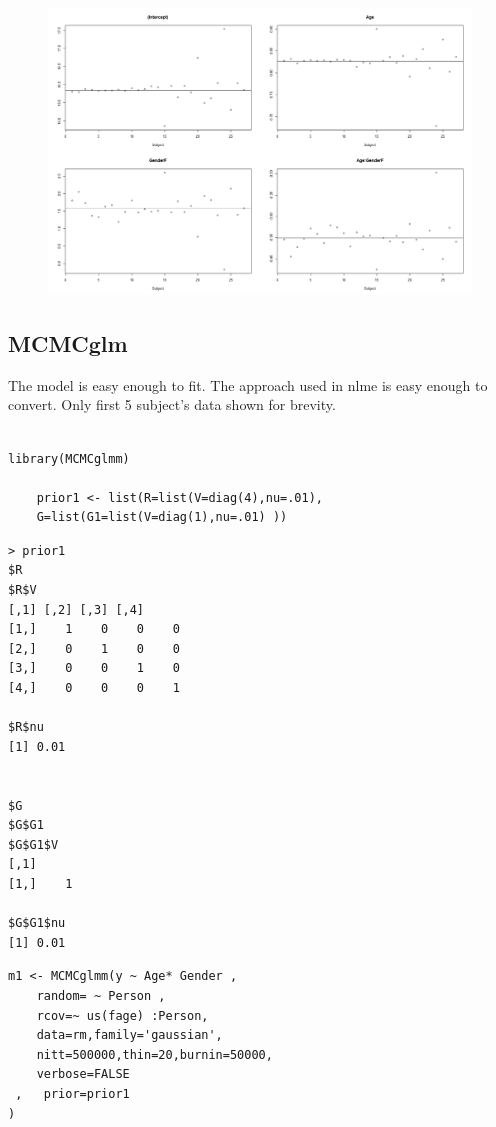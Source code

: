 \documentclass[a4paper,12pt]{article}
\begin{document}
\begin{figure}
\centering
\includegraphics[width=0.7\linewidth]{images/RbloggersPlot4}
\caption{}
\label{fig:RbloggersPlot4}
\end{figure}


\subsection{MCMCglm}

The model is easy enough to fit. The approach used in nlme is easy enough to convert. Only first 5 subject's data shown for brevity. 

\begin{framed}
	\begin{verbatim}
	
library(MCMCglmm)	
	
	prior1 <- list(R=list(V=diag(4),nu=.01),
    G=list(G1=list(V=diag(1),nu=.01) ))

\end{verbatim}
\end{framed}

\begin{verbatim}
> prior1
$R
$R$V
[,1] [,2] [,3] [,4]
[1,]    1    0    0    0
[2,]    0    1    0    0
[3,]    0    0    1    0
[4,]    0    0    0    1

$R$nu
[1] 0.01


$G
$G$G1
$G$G1$V
[,1]
[1,]    1

$G$G1$nu
[1] 0.01

\end{verbatim}

\begin{framed}
	\begin{verbatim}
m1 <- MCMCglmm(y ~ Age* Gender , 
    random= ~ Person ,
    rcov=~ us(fage) :Person,
    data=rm,family='gaussian',
    nitt=500000,thin=20,burnin=50000,
    verbose=FALSE
 ,   prior=prior1
)
\end{verbatim}
\end{framed}
\end{document}
